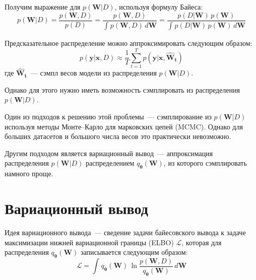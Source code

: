 \documentclass{article}
\numberwithin{equation}{section}
\begin{document}
    Получим выражение для $p(\pmb{W}| D)$, используя формулу Байеса:
    \begin{equation}
        p(\pmb{W}| D)
        =
        \frac
            {p(\pmb{W}, D)}
            {p(D)}
        =
        \frac
            {p(\pmb{W}, D)}
            {
                \int_{}{
                    p(\pmb{W}, D)
                    \,
                    d\pmb{W}
                }
            }
        =
        \frac
            {
                p(D | \pmb{W})
                \,
                p(\pmb{W})
            }
            {
                \int_{}{
                    p(D | \pmb{W})
                    \,
                    p(\pmb{W})
                    \,
                    d\pmb{W}
                }
            }
    \end{equation}

    Предсказательное распределение можно аппроксимировать следующим образом:
    \begin{equation}
        p(\pmb{y} | \pmb{x}, D)
        \approx
            \frac{1}{T}
            \sum_{t=1}^{T}{
                p (
                    \pmb{y} | \pmb{x},
                    \pmb{\hat{W}_{t}}
                )
            }
    \end{equation}
    где $\pmb{\hat{W}_{t}}$~--- сэмпл весов модели из распределения $p(\pmb{W}| D)$.

    Однако для этого нужно иметь возможность сэмплировать из распределения $p(\pmb{W}| D)$.

    Один из подходов к решению этой проблемы~--- сэмплирование из $p(\pmb{W}| D)$
    используя методы Монте--Карло для марковских цепей (MCMC).
    Однако для больших датасетов и большого числа весов это практически невозможно.

    Другим подходом является вариационный вывод~---
    аппроксимация распределения $p(\pmb{W}| D)$ распределением $q_{\pmb{\theta}}(\pmb{W})$,
    из которого сэмплировать намного проще.

    \section{Вариационный вывод}

    Идея вариационного вывода~--- сведение задачи байесовского вывода
    к задаче максимизации нижней вариационной границы (ELBO) $\mathcal{L}$,
    которая для распределения $q_{\pmb{\theta}}(\pmb{W})$
    записывается следующим образом:
    \begin{equation}
        \mathcal{L}
        =
            \int_{}{
                q_{\pmb{\theta}}(\pmb{W})
                \,
                \ln{
                    \frac
                        {p(\pmb{W}, D)}
                        {q_{\pmb{\theta}}(\pmb{W})}
                }
                \,
                d\pmb{W}
            }
    \end{equation}
\end{document}
